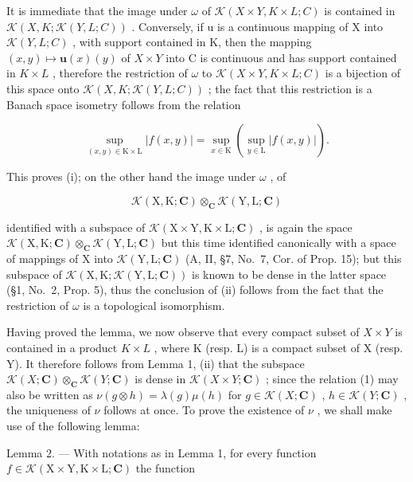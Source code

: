 It is immediate that the image under \(\omega\) of \(\mathcal{K}(X\times Y,K\times L;C)\) is contained in \(\mathcal{K}(X,K;\mathcal{K}(Y,L;C))\) . Conversely, if u is a continuous mapping of X into \(\mathcal{K}(Y,L;C)\) , with support contained in K, then the mapping \((x,y)\mapsto\mathbf{u}(x)(y)\) of \(X\times Y\) into C is continuous and has support contained in \(K\times L\) , therefore the restriction of \(\omega\) to \(\mathcal{K}(X\times Y,K\times L;C)\) is a bijection of this space onto \(\mathcal{K}(X,K;\mathcal{K}(Y,L;C))\) ; the fact that this restriction is a Banach space isometry follows from the relation

\[
\sup _ {(x, y) \in \mathrm{K} \times \mathrm{L}} | f (x, y) | = \sup _ {x \in \mathrm{K}} \left(\sup _ {y \in \mathrm{L}} | f (x, y) |\right).
\]

This proves (i); on the other hand the image under \(\omega\) , of

\[
\mathcal {K} (\mathrm{X}, \mathrm{K}; \mathbf {C}) \otimes_ {\mathbf {C}} \mathcal {K} (\mathrm{Y}, \mathrm{L}; \mathbf {C})
\]

identified with a subspace of \(\mathcal{K}(\mathrm{X}\times \mathrm{Y},\mathrm{K}\times \mathrm{L};\mathbf{C})\) , is again the space \(\mathcal{K}(\mathrm{X},\mathrm{K};\mathbf{C})\otimes_{\mathbf{C}}\mathcal{K}(\mathrm{Y},\mathrm{L};\mathbf{C})\) but this time identified canonically with a space of mappings of X into \(\mathcal{K}(\mathrm{Y},\mathrm{L};\mathbf{C})\) (A, II, §7, No.~7, Cor. of Prop. 15); but this subspace of \(\mathcal{K}(\mathrm{X},\mathrm{K};\mathcal{K}(\mathrm{Y},\mathrm{L};\mathbf{C}))\) is known to be dense in the latter space (§1, No.~2, Prop. 5), thus the conclusion of (ii) follows from the fact that the restriction of \(\omega\) is a topological isomorphism.

Having proved the lemma, we now observe that every compact subset of \(X \times Y\) is contained in a product \(K \times L\) , where K (resp. L) is a compact subset of X (resp. Y). It therefore follows from Lemma 1, (ii) that the subspace \(\mathcal{K}(X; \mathbf{C}) \otimes_{\mathbf{C}} \mathcal{K}(Y; \mathbf{C})\) is dense in \(\mathcal{K}(X \times Y; \mathbf{C})\) ; since the relation (1) may also be written as \(\nu(g \otimes h) = \lambda(g)\mu(h)\) for \(g \in \mathcal{K}(X; \mathbf{C})\) , \(h \in \mathcal{K}(Y; \mathbf{C})\) , the uniqueness of \(\nu\) follows at once. To prove the existence of \(\nu\) , we shall make use of the following lemma:

Lemma 2. --- With notations as in Lemma 1, for every function \(f \in \mathcal{K}(\mathrm{X} \times \mathrm{Y}, \mathrm{K} \times \mathrm{L}; \mathbf{C})\) the function

